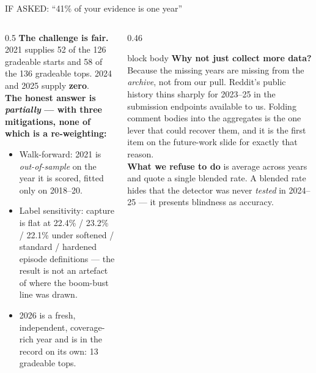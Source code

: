 \documentclass[aspectratio=169,11pt]{beamer}
\begin{document}
\begin{frame}{IF ASKED: ``41\% of your evidence is one year''}
  \begin{columns}[T]
    \begin{column}{0.5\linewidth}
      \footnotesize
      \textbf{The challenge is fair.} 2021 supplies 52 of the 126 gradeable
      starts and 58 of the 136 gradeable tops. 2024 and 2025 supply
      \textbf{zero}.
      \vspace{0.6em}
      \\ \textbf{The honest answer is \emph{partially} --- with three
      mitigations, none of which is a re-weighting:}
      \begin{itemize}
        \item Walk-forward: 2021 is \emph{out-of-sample} on the year it is
          scored, fitted only on 2018--20.
        \item Label sensitivity: capture is flat at
          22.4\% / 23.2\% / 22.1\% under softened / standard / hardened
          episode definitions --- the result is not an artefact of where the
          boom-bust line was drawn.
        \item 2026 is a fresh, independent, coverage-rich year and is in the
          record on its own: 13 gradeable tops.
      \end{itemize}
    \end{column}
    \begin{column}{0.46\linewidth}
      \begin{beamercolorbox}[wd=\linewidth,sep=0.8em]{block body}
        \footnotesize
        \textbf{\color{gicnavy}Why not just collect more data?}
        \\[0.4em]
        Because the missing years are missing from the \emph{archive}, not from
        our pull. Reddit's public history thins sharply for 2023--25 in the
        submission endpoints available to us. Folding comment bodies into the
        aggregates is the one lever that could recover them, and it is the
        first item on the future-work slide for exactly that reason.
        \\[0.6em]
        \textbf{What we refuse to do} is average across years and quote a
        single blended rate. A blended rate hides that the detector was never
        \emph{tested} in 2024--25 --- it presents blindness as accuracy.
      \end{beamercolorbox}
    \end{column}
  \end{columns}
\end{frame}
\end{document}
